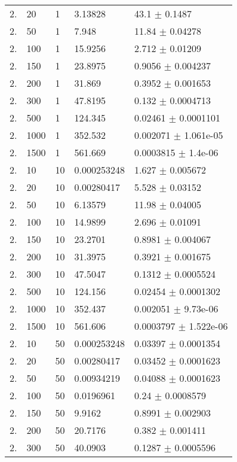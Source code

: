 \begin{longtable}{lllll}
  2. &    20 &     1 &  3.13828 &     43.1 $\pm$   0.1487 \\
  2. &    50 &     1 &    7.948 &    11.84 $\pm$  0.04278 \\
  2. &   100 &     1 &  15.9256 &    2.712 $\pm$  0.01209 \\
  2. &   150 &     1 &  23.8975 &   0.9056 $\pm$ 0.004237 \\
  2. &   200 &     1 &   31.869 &   0.3952 $\pm$ 0.001653 \\
  2. &   300 &     1 &  47.8195 &    0.132 $\pm$ 0.0004713 \\
  2. &   500 &     1 &  124.345 &  0.02461 $\pm$ 0.0001101 \\
  2. &  1000 &     1 &  352.532 & 0.002071 $\pm$ 1.061e-05 \\
  2. &  1500 &     1 &  561.669 & 0.0003815 $\pm$  1.4e-06 \\
  2. &    10 &    10 & 0.000253248 &    1.627 $\pm$ 0.005672 \\
  2. &    20 &    10 & 0.00280417 &    5.528 $\pm$  0.03152 \\
  2. &    50 &    10 &  6.13579 &    11.98 $\pm$  0.04005 \\
  2. &   100 &    10 &  14.9899 &    2.696 $\pm$  0.01091 \\
  2. &   150 &    10 &  23.2701 &   0.8981 $\pm$ 0.004067 \\
  2. &   200 &    10 &  31.3975 &   0.3921 $\pm$ 0.001675 \\
  2. &   300 &    10 &  47.5047 &   0.1312 $\pm$ 0.0005524 \\
  2. &   500 &    10 &  124.156 &  0.02454 $\pm$ 0.0001302 \\
  2. &  1000 &    10 &  352.437 & 0.002051 $\pm$ 9.73e-06 \\
  2. &  1500 &    10 &  561.606 & 0.0003797 $\pm$ 1.522e-06 \\
  2. &    10 &    50 & 0.000253248 &  0.03397 $\pm$ 0.0001354 \\
  2. &    20 &    50 & 0.00280417 &  0.03452 $\pm$ 0.0001623 \\
  2. &    50 &    50 & 0.00934219 &  0.04088 $\pm$ 0.0001623 \\
  2. &   100 &    50 & 0.0196961 &     0.24 $\pm$ 0.0008579 \\
  2. &   150 &    50 &   9.9162 &   0.8991 $\pm$ 0.002903 \\
  2. &   200 &    50 &  20.7176 &    0.382 $\pm$ 0.001411 \\
  2. &   300 &    50 &  40.0903 &   0.1287 $\pm$ 0.0005596 \\

\end{longtable}
